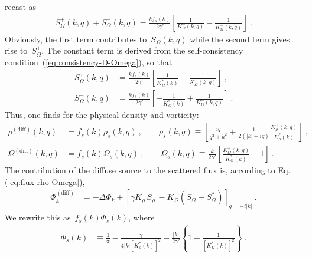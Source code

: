 \documentclass[preprint,aps,eqsecnum, prb]{revtex4-1}
\newcommand{\fplus}[1]{{#1}^{+}}
\newcommand{\fminus}[1]{{#1}^{-}}
\begin{document}
recast as
\begin{align}
  \fplus{S}_\Omega(k, q) + \fminus{S}_\Omega(k, q) =
  \frac{k f_s(k)}{2\gamma'} \left[\frac{1}{\fminus{K}_\Omega(k, q)}
  - \frac{1}{\fplus{K}_\Omega(k, q)} \right]\ .
\end{align}
Obviously, the first term contributes to~$\fminus{S}_\Omega(k, q)$
while the second term gives rise to~$\fplus{S}_\Omega$. The constant
term is derived from the self-consistency
condition~(\ref{eq:consistency-D-Omega}), so that
\begin{align}
  \fplus{S}_\Omega(k, q) &= \frac{k f_s(k)}{2\gamma'}
  \left[\frac{1}{K^\ast_\Omega(k)} - \frac{1}{\fplus{K}_\Omega(k, q)}
  \right] \ , \\\nonumber
  \fminus{S}_\Omega(k, q) &= \frac{k f_s(k)}{2\gamma'}
  \left[-\frac{1}{K^\ast_\Omega(k)} + \frac{1}{\fminus{K}_\Omega(k, q)}
  \right] \ .
\end{align}
Thus, one finds for the physical density and vorticity:
\begin{align}
  \label{eq:rho-s}
  \rho^\mathrm{(diff)}(k, q) &= f_s(k) \rho_s(k, q)\ ,
                               \qquad \rho_s(k, q) \equiv
  \left[\frac{iq}{q^2 + k^2} + \frac{1}{2(|k| + iq)}
   \frac{\fplus{K}_{\rho}(k, q)}{K_\rho^\ast(k)}
  \right]
  \ , \\
  \label{eq:omega-s}
  \Omega^\mathrm{(diff)}(k, q) &= f_s(k) \Omega_s(k, q)\ , \qquad
                  \Omega_s(k, q) \equiv \frac{k}{2\gamma'} \left[
  \frac{\fplus{K}_\Omega(k, q)}{K_\Omega^\ast(k)} - 1
  \right]\ .
\end{align}
The contribution of the diffuse source to
the scattered flux is, according to Eq.(\ref{eq:flux-rho-Omega}),
\begin{align}
  \label{eq:phi-diff}
  \Phi^\mathrm{(diff)}_k &= -\Delta\Phi_{k} +
  \left[\gamma \fminus{K}_\rho \fminus{S}_\rho
  - \fminus{K}_\Omega \left(\fminus{S}_\Omega
                           + S_\Omega^\ast\right)\right]_{q = -i |k|}\ .
\end{align}
We rewrite this as~$f_s(k) \Phi_s(k)$, where
\begin{align}
  \Phi_s(k) &\equiv
                       \frac{1}{\pi}
   - \frac{\gamma}{4|k| \left[K_\rho^\ast(k)\right]^2}
                - \frac{|k|}{2\gamma'}
                 \left\{1 - \frac{1}{\left[K_\Omega^\ast(k)\right]^2} \right\}
   \nonumber
  \ .
\end{align}
\end{document}
